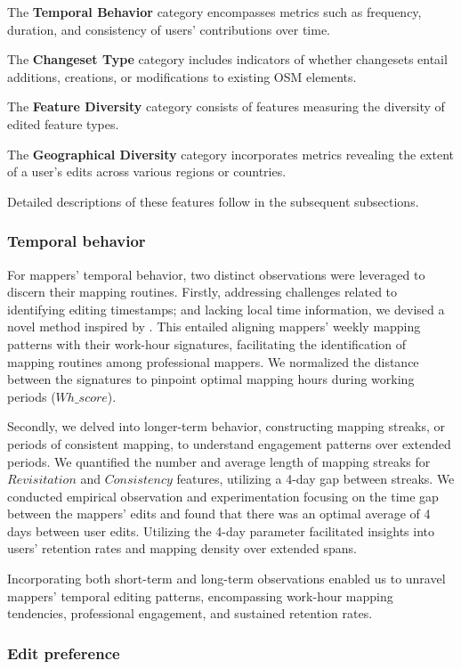 \documentclass[manuscript,screen,review]{acmart}
\begin{document}
The \textbf{Temporal Behavior} category encompasses metrics such as frequency, duration, and consistency of users' contributions over time. 

The \textbf{Changeset Type} category includes indicators of whether changesets entail additions, creations, or modifications to existing OSM elements.

The \textbf{Feature Diversity} category consists of features measuring the diversity of edited feature types.

The \textbf{Geographical Diversity} category incorporates metrics revealing the extent of a user's edits across various regions or countries.

Detailed descriptions of these features follow in the subsequent subsections.

\subsubsection{Temporal behavior}

For mappers' temporal behavior, two distinct observations were leveraged to discern their mapping routines. Firstly, addressing challenges related to identifying editing timestamps; and lacking local time information, we devised a novel method inspired by \cite{Veselovsky22}. This entailed aligning mappers' weekly mapping patterns with their work-hour signatures, facilitating the identification of mapping routines among professional mappers. We normalized the distance between the signatures to pinpoint optimal mapping hours during working periods ($Wh\_score$).

Secondly, we delved into longer-term behavior, constructing mapping streaks, or periods of consistent mapping, to understand engagement patterns over extended periods. We quantified the number and average length of mapping streaks for $Revisitation$ and $Consistency$ features, utilizing a 4-day gap between streaks. We conducted empirical observation and experimentation focusing on the time gap between the mappers’ edits and found that there was an optimal average of 4 days between user edits. Utilizing the 4-day parameter facilitated insights into users' retention rates and mapping density over extended spans.

Incorporating both short-term and long-term observations enabled us to unravel mappers' temporal editing patterns, encompassing work-hour mapping tendencies, professional engagement, and sustained retention rates.

\subsubsection{Edit preference}
\end{document}

